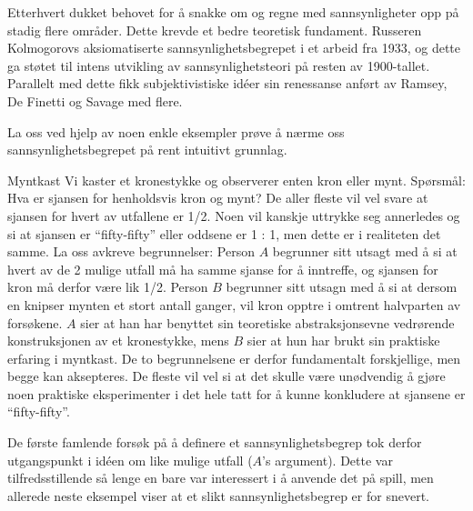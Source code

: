 Etterhvert dukket behovet for å snakke om og regne med
sannsynligheter opp på stadig flere områder. Dette krevde et
bedre teoretisk fundament. Russeren Kolmogorovs aksiomatiserte 
sannsynlighetsbegrepet i et arbeid fra 1933, og dette
ga støtet til intens utvikling av sannsynlighetsteori på resten av 
1900-tallet. Parallelt med dette fikk subjektivistiske id\'{e}er 
sin renessanse anført av Ramsey, De Finetti og Savage med flere.

La oss ved hjelp av noen enkle eksempler prøve å nærme oss
sannsynlighetsbegrepet på rent intuitivt grunnlag.\\

\begin{eksempel}{Myntkast}
Vi kaster et kronestykke og observerer enten kron eller mynt. 
Spørsmål:  Hva er sjansen for henholdsvis kron og mynt?  De aller
fleste vil vel svare at sjansen for hvert av utfallene er 1/2. 
Noen vil kanskje uttrykke seg annerledes og si at sjansen er
``fifty-fifty'' eller oddsene er 1 : 1, men dette er i realiteten
det samme.  La oss avkreve begrunnelser:  Person $A$ begrunner sitt
utsagt med å si at hvert av de 2 mulige utfall må ha samme sjanse
for å inntreffe, og sjansen for kron må derfor være lik 1/2. 
Person $B$ begrunner sitt utsagn med å si at dersom en knipser
mynten et stort antall ganger, vil kron opptre i omtrent halvparten 
av forsøkene.  $A$ sier at han har benyttet sin teoretiske
abstraksjonsevne vedrørende konstruksjonen av et kronestykke,
mens $B$ sier at hun har brukt sin praktiske erfaring i myntkast. 
De to begrunnelsene er derfor fundamentalt forskjellige, men
begge kan aksepteres.  De fleste vil vel si at det skulle være
unødvendig å gjøre noen praktiske eksperimenter i det hele tatt
for å kunne konkludere at sjansene er ``fifty-fifty''.
\end{eksempel}
                          
De første famlende forsøk på å definere et sannsynlighetsbegrep
tok derfor utgangspunkt i id\'{e}en om like mulige utfall ($A$'s
argument).  Dette var tilfredsstillende så lenge en bare var
interessert i å anvende det på spill, men allerede neste eksempel
viser at et slikt sannsynlighetsbegrep er for snevert.\\


